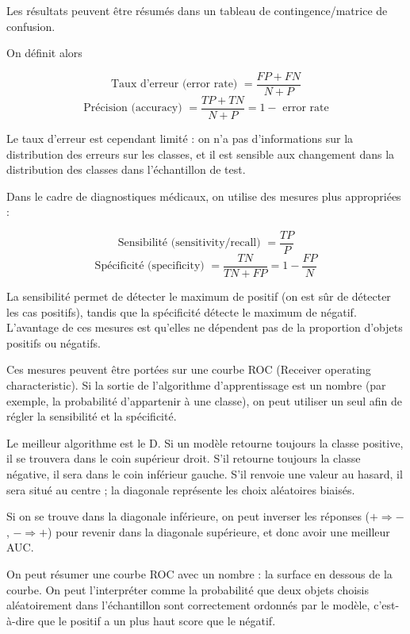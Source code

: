 	Les résultats peuvent être résumés dans un tableau de contingence/matrice de confusion.
	
	
	On définit alors
	
	$$\text{Taux d'erreur (error rate) } = \frac{FP + FN}{N + P}$$
	$$\text{Précision (accuracy) } = \frac{TP + TN}{N + P} = 1 - \text{ error rate}$$
	
	Le taux d'erreur est cependant limité : on n'a pas d'informations sur la distribution des erreurs sur les classes, et il est sensible aux changement dans la distribution des classes dans l'échantillon de test.
	
	
	Dans le cadre de diagnostiques médicaux, on utilise des mesures plus appropriées :
	
	$$\text{Sensibilité (sensitivity/recall) } = \frac{TP}{P}$$
	$$\text{Spécificité (specificity) } = \frac{TN}{TN + FP} = 1 - \frac{FP}{N}$$
	
	La sensibilité permet de détecter le maximum de positif (on est sûr de détecter les cas positifs), tandis que la spécificité détecte le maximum de négatif. L'avantage de ces mesures est qu'elles ne dépendent pas de la proportion d'objets positifs ou négatifs.
	
	Ces mesures peuvent être portées sur une courbe ROC (Receiver operating characteristic). Si la sortie de l'algorithme d'apprentissage est un nombre (par exemple, la probabilité d'appartenir à une classe), on peut utiliser un seul afin de régler la sensibilité et la spécificité.
	
	
	Le meilleur algorithme est le D. Si un modèle retourne toujours la classe positive, il se trouvera dans le coin supérieur droit. S'il retourne toujours la classe négative, il sera dans le coin inférieur gauche. S'il renvoie une valeur au hasard, il sera situé au centre ; la diagonale représente les choix aléatoires biaisés.
	
	Si on se trouve dans la diagonale inférieure, on peut inverser les réponses ($+ \Rightarrow -$, $- \Rightarrow +$) pour revenir dans la diagonale supérieure, et donc avoir une meilleur AUC.
	
	
	On peut résumer une courbe ROC avec un nombre : la surface en dessous de la courbe. On peut l'interpréter comme la probabilité que deux objets choisis aléatoirement dans l'échantillon sont correctement ordonnés par le modèle, c'est-à-dire que le positif a un plus haut score que le négatif.
	
